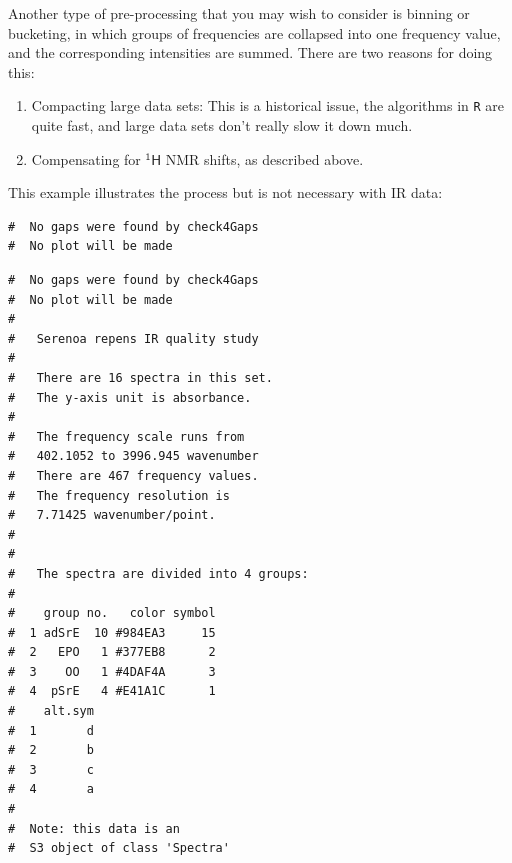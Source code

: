 \documentclass[letter,10pt,twocolumn,twoside,printwatermark=false]{pinp}
\begin{document}
Another type of pre-processing that you may wish to consider is binning
or bucketing, in which groups of frequencies are collapsed into one
frequency value, and the corresponding intensities are summed. There are
two reasons for doing this:

\begin{enumerate}
  \item Compacting large data sets:  This is a historical issue, the algorithms in \texttt{R} are quite fast, and large data sets don't really slow it down much.
  \item  Compensating for $\mathsf{^{1}H}$ NMR shifts, as described above.
\end{enumerate}

This example illustrates the process but is not necessary with IR data:

\begin{Shaded}
\begin{Highlighting}[]
\StringTok{ } \NormalTok{)}
\end{Highlighting}
\end{Shaded}

\begin{ShadedResult}
\begin{verbatim}
#  No gaps were found by check4Gaps
#  No plot will be made
\end{verbatim}
\end{ShadedResult}

\begin{Shaded}
\begin{Highlighting}[]
\end{Highlighting}
\end{Shaded}

\begin{ShadedResult}
\begin{verbatim}
#  No gaps were found by check4Gaps
#  No plot will be made
#  
#   Serenoa repens IR quality study 
#  
#   There are 16 spectra in this set.
#   The y-axis unit is absorbance.
#  
#   The frequency scale runs from
#   402.1052 to 3996.945 wavenumber
#   There are 467 frequency values.
#   The frequency resolution is
#   7.71425 wavenumber/point.
#  
#  
#   The spectra are divided into 4 groups: 
#  
#    group no.   color symbol
#  1 adSrE  10 #984EA3     15
#  2   EPO   1 #377EB8      2
#  3    OO   1 #4DAF4A      3
#  4  pSrE   4 #E41A1C      1
#    alt.sym
#  1       d
#  2       b
#  3       c
#  4       a
#  
#  Note: this data is an
#  S3 object of class 'Spectra'
\end{verbatim}
\end{ShadedResult}
\end{document}
